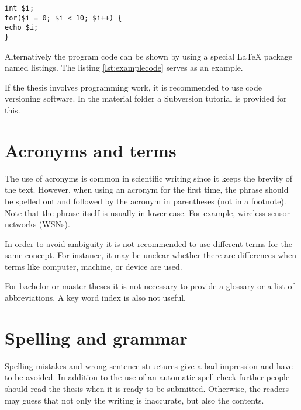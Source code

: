 \begin{lstlisting}[frame=trb,captionpos=b,caption=Display of program code using 1stlisting,label=lst:examplecode]
int $i;
for($i = 0; $i < 10; $i++) {
echo $i;
}
\end{lstlisting} 

Alternatively the program code can be shown by using a special LaTeX package named listings. The listing \ref{lst:examplecode} serves as an example.

If the thesis involves programming work, it is recommended to use code versioning software. In the material folder a Subversion tutorial is provided for this.

\section{Acronyms and terms}

The use of acronyms is common in scientific writing since it keeps the brevity of the text. However, when using an acronym for the first time, the phrase should be spelled out and followed by the acronym in parentheses (not in a footnote). Note that the phrase itself is usually in lower case. For example, wireless sensor networks (WSNs).

In order to avoid ambiguity it is not recommended to use different terms for the same concept. For instance, it may be unclear whether there are differences when terms like computer, machine, or device are used.

For bachelor or master theses it is not necessary to provide a glossary or a list of abbreviations. A key word index is also not useful.
 
\section{Spelling and grammar}

Spelling mistakes and wrong sentence structures give a bad impression and have to be avoided. In addition to the use of an automatic spell check further people should read the thesis when it is ready to be submitted. Otherwise, the readers may guess that not only the writing is inaccurate, but also the contents.

\endinput 